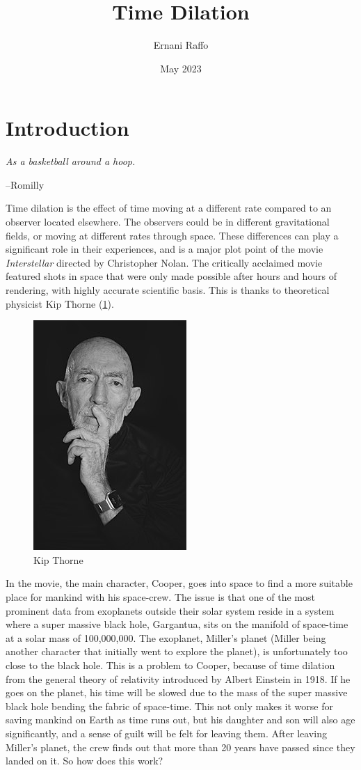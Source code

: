 \documentclass{article}
\title{Time Dilation}
\author{Ernani Raffo}
\date{May 2023}
\begin{document}

\maketitle

\section{Introduction}
\setlength{\epigraphwidth}{0.30\textwidth}
\epigraph{\emph{As a basketball around a hoop.}}{--Romilly}
Time dilation is the effect of time moving at a different rate compared to an observer located elsewhere. 
The observers could be in different gravitational fields, or moving at different rates through space.
These differences can play a significant role in their experiences, and is a major plot point of the movie
\textit{Interstellar} directed by Christopher Nolan.
The critically acclaimed movie featured shots in space that were only made possible after hours and hours
of rendering, with highly accurate scientific basis. This is thanks to theoretical physicist Kip Thorne
(\ref{kip}).

\begin{figure}
\includegraphics[scale=0.5]{thorne}
\caption{Kip Thorne}
\label{kip}
\end{figure}

In the movie, the main character, Cooper, goes into space to find a more suitable place for mankind with his space-crew. 
The issue is that one of the most prominent data from exoplanets outside their solar system reside in a system where a 
super massive black hole, Gargantua, sits on the manifold of space-time at a solar mass of 100,000,000. 
The exoplanet, Miller's planet (Miller being another character that initially went to explore the planet), is unfortunately too close to the black hole. This is a problem to Cooper, because of time dilation from the general theory of relativity
introduced by Albert Einstein in 1918. If he goes on the planet, his time will be slowed due to the mass of the super massive
black hole bending the fabric of space-time. This not only makes it worse for saving mankind on Earth as time runs out, but his
daughter and son will also age significantly, and a sense of guilt will be felt for leaving them. After leaving Miller's planet,
the crew finds out that more than 20 years have passed since they landed on it. So how does this work?
\end{document}
